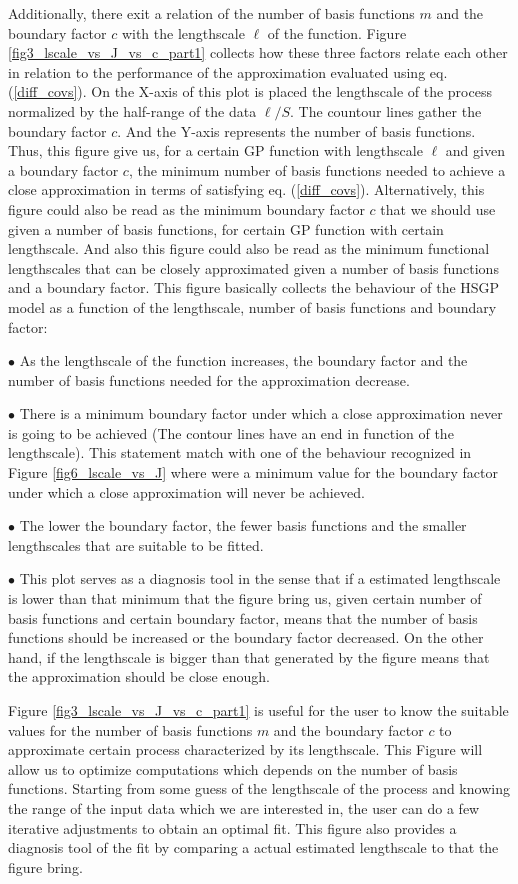 \documentclass[]{interact}
\theoremstyle{plain}%
\theoremstyle{definition}
\theoremstyle{remark}
\begin{document}
Additionally, there exit a relation of the number of basis functions $m$ and the boundary factor $c$ with the lengthscale $\ell$ of the function. Figure \ref{fig3_lscale_vs_J_vs_c_part1} collects how these three factors relate each other in relation to the performance of the approximation evaluated using eq. (\ref{diff_covs}). On the X-axis of this plot is placed the lengthscale of the process normalized by the half-range of the data $\ell/S$. The countour lines gather the boundary factor $c$. And the Y-axis represents the number of basis functions. Thus, this figure give us, for a certain GP function with lengthscale $\ell$ and given a boundary factor $c$, the minimum number of basis functions needed to achieve a close approximation in terms of satisfying eq. (\ref{diff_covs}). Alternatively, this figure could also be read as the minimum boundary factor $c$ that we should use given a number of basis functions, for certain GP function with certain lengthscale. And also this figure could also be read as the minimum functional lengthscales that can be closely approximated given a number of basis functions and a boundary factor. This figure basically collects the behaviour of the HSGP model as a function of the lengthscale, number of basis functions and boundary factor:

$\bullet$ As the lengthscale of the function increases, the boundary factor and the number of basis functions needed for the approximation decrease.

$\bullet$ There is a minimum boundary factor under which a close approximation never is going to be achieved (The contour lines have an end in function of the lengthscale). This statement match with one of the behaviour recognized in Figure \ref{fig6_lscale_vs_J} where were a minimum value for the boundary factor under which a close approximation will never be achieved.

$\bullet$ The lower the boundary factor, the fewer basis functions and the smaller lengthscales that are suitable to be fitted. 

$\bullet$ This plot serves as a diagnosis tool in the sense that if a estimated lengthscale is lower than that minimum that the figure bring us, given certain number of basis functions and certain boundary factor, means that the number of basis functions should be increased or the boundary factor decreased. On the other hand, if the lengthscale is bigger than that generated by the figure means that the approximation should be close enough.

Figure \ref{fig3_lscale_vs_J_vs_c_part1} is useful for the user to know the suitable values for the number of basis functions $m$ and the boundary factor $c$ to approximate certain process characterized by its lengthscale. This Figure will allow us to optimize computations which depends on the number of basis functions. Starting from some guess of the lengthscale of the process and knowing the range of the input data which we are interested in, the user can do a few iterative adjustments to obtain an optimal fit. This figure also provides a diagnosis tool of the fit by comparing a actual estimated lengthscale to that the figure bring. 
\end{document}
